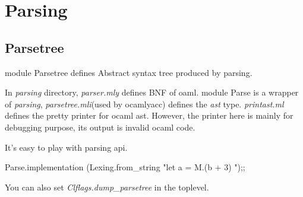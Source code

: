 \section{Parsing}

\subsection{Parsetree}

module Parsetree defines Abstract syntax tree produced by parsing.

In \textit{parsing} directory, \textit{parser.mly} defines BNF of oaml.
module Parse is a wrapper of \textit{parsing},
\textit{parsetree.mli}(used by ocamlyacc) defines the \textit{ast}
type. \textit{printast.ml} defines the pretty printer for ocaml
ast. However, the printer here is mainly for debugging purpose, its
output is invalid ocaml code.

It's easy to play with parsing api.

\begin{ocamlcode}
  Parse.implementation (Lexing.from_string "let a =  M.(b + 3) ");;
\end{ocamlcode}
You can also set \textit{Clflags.dump\_parsetree} in the toplevel.


